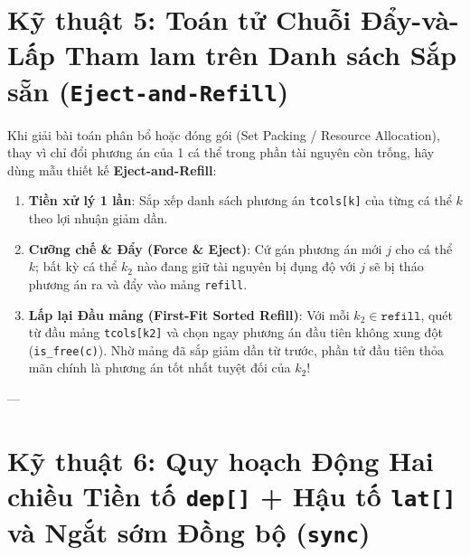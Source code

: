 \documentclass[11pt,a4paper]{article}
\begin{document}
\section{Kỹ thuật 5: Toán tử Chuỗi Đẩy-và-Lấp Tham lam trên Danh sách Sắp sẵn (\texttt{Eject-and-Refill})}

Khi giải bài toán phân bổ hoặc đóng gói (Set Packing / Resource Allocation), thay vì chỉ đổi phương án của 1 cá thể trong phần tài nguyên còn trống, hãy dùng mẫu thiết kế \textbf{Eject-and-Refill}:
\begin{enumerate}[leftmargin=1.5em]
    \item \textbf{Tiền xử lý 1 lần}: Sắp xếp danh sách phương án \texttt{tcols[k]} của từng cá thể $k$ theo lợi nhuận giảm dần.
    \item \textbf{Cưỡng chế & Đẩy (Force \& Eject)}: Cứ gán phương án mới $j$ cho cá thể $k$; bất kỳ cá thể $k_2$ nào đang giữ tài nguyên bị đụng độ với $j$ sẽ bị tháo phương án ra và đẩy vào mảng \texttt{refill}.
    \item \textbf{Lấp lại Đầu mảng (First-Fit Sorted Refill)}: Với mỗi $k_2 \in \texttt{refill}$, quét từ đầu mảng \texttt{tcols[k2]} và chọn ngay phương án đầu tiên không xung đột (\texttt{is\_free(c)}). Nhờ mảng đã sắp giảm dần từ trước, phần tử đầu tiên thỏa mãn chính là phương án tốt nhất tuyệt đối của $k_2$!
\end{enumerate}

---

\section{Kỹ thuật 6: Quy hoạch Động Hai chiều Tiền tố \texttt{dep[]} + Hậu tố \texttt{lat[]} và Ngắt sớm Đồng bộ (\texttt{sync})}
\end{document}
